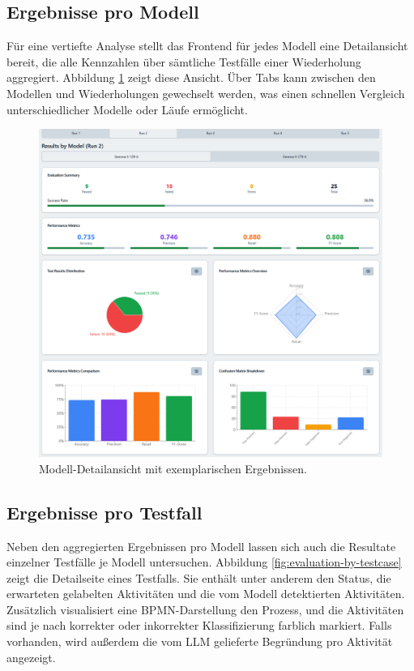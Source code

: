 \subsection*{Ergebnisse pro Modell}

Für eine vertiefte Analyse stellt das Frontend für jedes Modell eine Detailansicht bereit, die alle Kennzahlen über sämtliche Testfälle einer Wiederholung aggregiert. Abbildung \ref{fig:evaluation-by-model} zeigt diese Ansicht. Über Tabs kann zwischen den Modellen und Wiederholungen gewechselt werden, was einen schnellen Vergleich unterschiedlicher Modelle oder Läufe ermöglicht.

\begin{figure}[h]
    \centering
    \includegraphics[width=\textwidth]{images/evaluation/evaluation-result-by-model_new}
    \caption{Modell-Detailansicht mit exemplarischen Ergebnissen.}
    \label{fig:evaluation-by-model}
\end{figure}

\subsection*{Ergebnisse pro Testfall}

Neben den aggregierten Ergebnissen pro Modell lassen sich auch die Resultate einzelner Testfälle je Modell untersuchen. Abbildung \ref{fig:evaluation-by-testcase} zeigt die Detailseite eines Testfalls. Sie enthält unter anderem den Status, die erwarteten gelabelten Aktivitäten und die vom Modell detektierten Aktivitäten. Zusätzlich visualisiert eine \ac{BPMN}-Darstellung den Prozess, und die Aktivitäten sind je nach korrekter oder inkorrekter Klassifizierung farblich markiert. Falls vorhanden, wird außerdem die vom  \ac{LLM} gelieferte Begründung pro Aktivität angezeigt.

